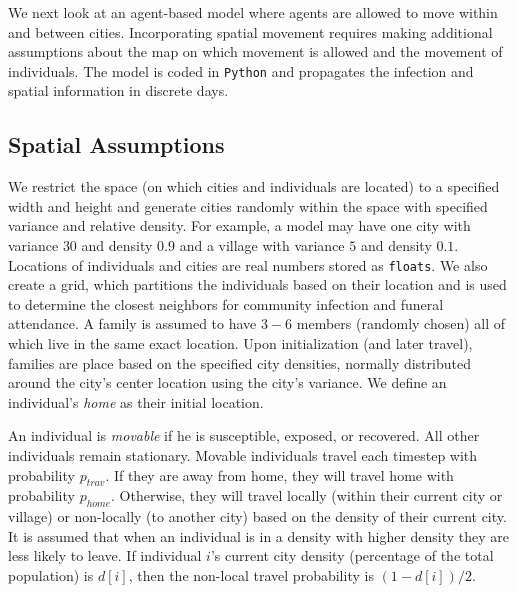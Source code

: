 
We next look at an agent-based model where agents are allowed to move within and between cities. Incorporating spatial movement requires making additional assumptions about the map on which movement is allowed and the movement of individuals. The model is coded in \texttt{Python} and propagates the infection and spatial information in discrete days. 

\subsection{Spatial Assumptions}
We restrict the space (on which cities and individuals are located) to a specified width and height and generate cities randomly within the space with specified variance and relative density. For example, a model may have one city with variance $30$ and density $0.9$ and a village with variance $5$ and density $0.1$. Locations of individuals and cities are real numbers stored as \texttt{floats}. We also create a grid, which partitions the individuals based on their location and is used to determine the closest neighbors for community infection and funeral attendance. A family is assumed to have $3-6$ members (randomly chosen) all of which live in the same exact location. Upon initialization (and later travel), families are place based on the specified city densities, normally distributed around the city's center location using the city's variance. We define an individual's \emph{home} as their initial location.

An individual is \emph{movable} if he is susceptible, exposed, or recovered. All other individuals remain stationary. Movable individuals travel each timestep with probability $p_{trav}$. If they are away from home, they will travel home with probability $p_{home}$. Otherwise, they will travel locally (within their current city or village) or non-locally (to another city) based on the density of their current city. It is assumed that when an individual is in a density with higher density they are less likely to leave. If individual $i$'s current city density (percentage of the total population) is $d[i]$, then the non-local travel probability is $(1-d[i])/2$.

